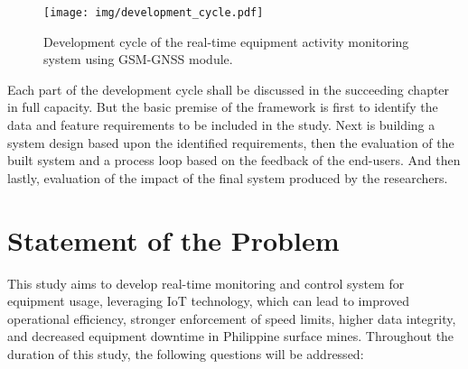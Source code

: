 \documentclass[12pt]{report}
\begin{document}
\begin{figure}[H]
    \centering
    \texttt{[image: img/development\_cycle.pdf]}
    \caption{Development cycle of the real-time equipment activity monitoring system using GSM-GNSS module.}
    \label{fig:development_cycle}
\end{figure}

Each part of the development cycle shall be discussed in the succeeding chapter in full capacity. 
But the basic premise of the framework is first to identify the data and feature requirements to be included in the study.
Next is building a system design based upon the identified requirements, then the evaluation of the built system and a process loop based on the feedback of the end-users.
And then lastly, evaluation of the impact of the final system produced by the researchers.

\section{Statement of the Problem}

This study aims to develop real-time monitoring and control system for equipment usage, leveraging IoT technology, which can lead to improved operational efficiency, stronger enforcement of speed limits, higher data integrity, and decreased equipment downtime in Philippine surface mines.
Throughout the duration of this study, the following questions will be addressed:
\end{document}

